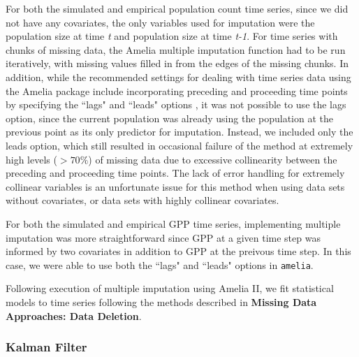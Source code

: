 \documentclass{article}
\begin{document}
\begin{linenumbers}
For both the simulated and empirical population count time series, since we did not have any covariates, the only variables used for imputation were the population size at time \textit{t} and population size at time \textit{t-1}. For time series with chunks of missing data, the Amelia multiple imputation function had to be run iteratively, with missing values filled in from the edges of the missing chunks. In addition, while the recommended settings for dealing with time series data using the Amelia package include incorporating preceding and proceeding time points by specifying the ``lags" and ``leads" options \citep{honaker2011}, it was not possible to use the lags option, since the current population was already using the population at the previous point as its only predictor for imputation. Instead, we included only the leads option, which still resulted in occasional failure of the method at extremely high levels ($>70\%$) of missing data due to excessive collinearity between the preceding and proceeding time points. The lack of error handling for extremely collinear variables is an unfortunate issue for this method when using data sets without covariates, or data sets with highly collinear covariates.  

For both the simulated and empirical GPP time series, implementing multiple imputation was more straightforward since GPP at a given time step was informed by two covariates in addition to GPP at the preivous time step. In this case, we were able to use both the ``lags" and ``leads" options in \texttt{amelia}. 

Following execution of multiple imputation using Amelia II, we fit statistical models to time series following the methods described in \textbf{Missing Data Approaches: Data Deletion}. 

\subsubsection*{Kalman Filter}


\end{linenumbers}
\end{document}
